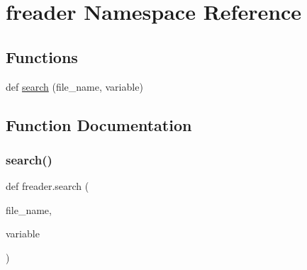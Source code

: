 \hypertarget{namespacefreader}{}\section{freader Namespace Reference}
\label{namespacefreader}
\subsection*{Functions}
\begin{DoxyCompactItemize}
\item 
def \hyperlink{namespacefreader_a2402258ff8ff9317ac912b1336eb659b}{search} (file\+\_\+name, variable)
\end{DoxyCompactItemize}


\subsection{Function Documentation}
\mbox{\label{namespacefreader_a2402258ff8ff9317ac912b1336eb659b}} 
\subsubsection{\texorpdfstring{search()}{search()}}
{\footnotesize\ttfamily def freader.\+search (\begin{DoxyParamCaption}\item[{}]{file\+\_\+name,  }\item[{}]{variable }\end{DoxyParamCaption})}


